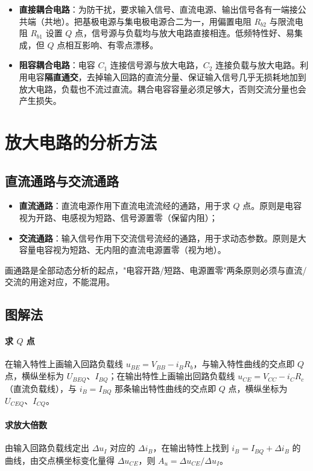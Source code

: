 \begin{itemize}
    \item \textbf{直接耦合电路}：为防干扰，要求输入信号、直流电源、输出信号各有一端接公共端（共地）。把基极电源与集电极电源合二为一，用偏置电阻 $R_{b2}$ 与限流电阻 $R_{b1}$ 设置 $Q$ 点，信号源与负载均与放大电路直接相连。低频特性好、易集成，但 $Q$ 点相互影响、有零点漂移。
    \item \textbf{阻容耦合电路}：电容 $C_1$ 连接信号源与放大电路，$C_2$ 连接负载与放大电路。利用电容\textbf{隔直通交}，去掉输入回路的直流分量、保证输入信号几乎无损耗地加到放大电路，负载也不流过直流。耦合电容容量必须足够大，否则交流分量也会产生损失。
\end{itemize}

\section{放大电路的分析方法}

\subsection{直流通路与交流通路}

\begin{itemize}
    \item \textbf{直流通路}：直流电源作用下直流电流流经的通路，用于求 $Q$ 点。原则是电容视为开路、电感视为短路、信号源置零（保留内阻）；
    \item \textbf{交流通路}：输入信号作用下交流信号流经的通路，用于求动态参数。原则是大容量电容视为短路、无内阻的直流电源置零（视为地）。
\end{itemize}
画通路是全部动态分析的起点，"电容开路/短路、电源置零"两条原则必须与直流/交流的用途对应，不能混用。

\subsection{图解法}

\paragraph{求 $Q$ 点}
在输入特性上画输入回路负载线 $u_{BE}=V_{BB}-i_B R_b$，与输入特性曲线的交点即 $Q$ 点，横纵坐标为 $U_{BEQ}$、$I_{BQ}$；在输出特性上画输出回路负载线 $u_{CE}=V_{CC}-i_C R_c$（直流负载线），与 $i_B=I_{BQ}$ 那条输出特性曲线的交点即 $Q$ 点，横纵坐标为 $U_{CEQ}$、$I_{CQ}$。

\paragraph{求放大倍数}
由输入回路负载线定出 $\Delta u_I$ 对应的 $\Delta i_B$，在输出特性上找到 $i_B=I_{BQ}+\Delta i_B$ 的曲线，由交点横坐标变化量得 $\Delta u_{CE}$，则 $A_u=\Delta u_{CE}/\Delta u_I$。

